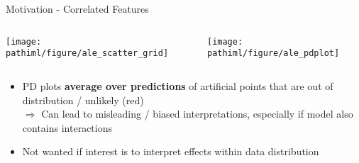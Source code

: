 \documentclass[11pt,compress,t,notes=noshow, aspectratio=169, xcolor=table]{beamer}
\newcommand{\pathiml}{../../slides/03_feature-effects/}
\begin{document}
\begin{frame}{Motivation - Correlated Features}

\begin{columns}[T]
\begin{column}{0.5\textwidth}
\centering
\texttt{[image: \\pathiml/figure/ale\_scatter\_grid]}
\end{column}
\begin{column}{0.5\textwidth}
\centering
\texttt{[image: \\pathiml/figure/ale\_pdplot]}
\end{column}
\end{columns}



\begin{itemize}
    \item PD plots \textbf{average over predictions} of artificial points that are out of distribution / unlikely (red)\\
    $\Rightarrow$ Can lead to misleading / biased interpretations, especially if model also contains interactions
    \item Not wanted if interest is to interpret effects within data distribution
\end{itemize}



\end{frame}
\end{document}
